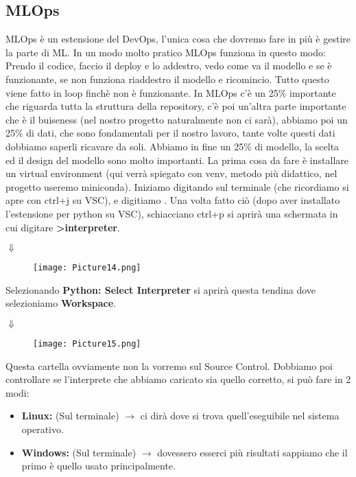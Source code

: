 \documentclass[a4paper,12pt]{article}
\begin{document}
\subsection{MLOps}
MLOps è un estensione del DevOps, l'unica cosa che dovremo fare in più è gestire la parte di ML. 
In un modo molto pratico MLOps funziona in questo modo:
\newline
Prendo il codice, faccio il deploy e lo addestro, vedo come va il modello e se è funzionante, se non funziona riaddestro il modello e ricomincio. Tutto questo viene fatto in loop finchè non è funzionante.
\newline
In MLOps c'è un 25\% importante che riguarda tutta la struttura della repository, c'è poi un'altra parte importante che è il buiseness (nel nostro progetto naturalmente non ci sarà), abbiamo poi un 25\% di dati, che sono fondamentali per il nostro lavoro, tante volte questi dati dobbiamo saperli ricavare da soli. Abbiamo in fine un 25\% di modello, la scelta ed il design del modello sono molto importanti. 
\vspace{1em}
La prima cosa da fare è installare un virtual environment (qui verrà spiegato con venv, metodo più didattico, nel progetto useremo miniconda).
Iniziamo digitando sul terminale (che ricordiamo si apre con ctrl+j su VSC), e digitiamo . 
Una volta fatto ciò (dopo aver installato l'estensione per python su VSC), schiacciano ctrl+p si aprirà una schermata in cui digitare 
\textbf{>interpreter}.
\begin{center}
    $\Downarrow$
\end{center}
\begin{figure}[H]
  \centering
  \texttt{[image: Picture14.png]}
  \label{etichetta14}
\end{figure}
Selezionando \textbf{Python: Select Interpreter} si aprirà questa tendina dove selezioniamo \textbf{Workspace}.
\begin{center}
    $\Downarrow$
\end{center}
\begin{figure}[H]
  \centering
  \texttt{[image: Picture15.png]}
  \label{etichetta15}
\end{figure}
Questa cartella ovviamente non la vorremo sul Source Control.
Dobbiamo poi controllare se l'interprete che abbiamo caricato sia quello corretto, si può fare in 2 modi:
\begin{itemize}
    \item \textbf{Linux: } (Sul terminale)  $\rightarrow$ ci dirà dove si trova quell'eseguibile nel sistema operativo.
    \item \textbf{Windows: } (Sul terminale)  $\rightarrow$ dovessero esserci più risultati sappiamo che il primo è quello usato principalmente.
\end{itemize}
\end{document}

